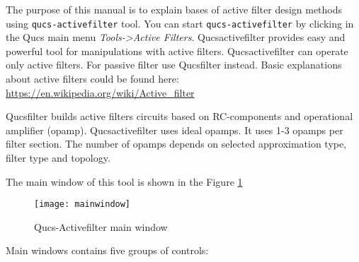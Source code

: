 %
%
%
%

\renewcommand{\thesubfigure}{\thefigure(\alph{subfigure})}
\makeatletter
  \renewcommand{\@thesubfigure}{\thesubfigure:\space}
  \renewcommand{\p@subfigure}{}
\makeatother

\renewcommand{\thesubtable}{\thetable(\alph{subtable})}
\makeatletter
  \renewcommand{\@thesubtable}{\thesubtable:\space}
  \renewcommand{\p@subtable}{}
\makeatother


The purpose of this manual is to explain bases of active filter design
methods using \verb|qucs-activefilter| tool. You can start
\verb|qucs-activefilter| by clicking in the Qucs main menu \emph{Tools->Active
Filters}. Qucsactivefilter provides easy and powerful tool for manipulations
with active filters. Qucsactivefilter can operate only active filters. For
passive filter use Qucsfilter instead. Basic explanations about active filters
could be found here: \url{https://en.wikipedia.org/wiki/Active_filter}

Qucsfilter builds active filters circuits based on RC-components and
operational amplifier (opamp). Qucsactivefilter uses ideal opamps.  It
uses 1-3 opamps per filter section. The number of opamps depends on selected
approximation type, filter type and topology.




The main window of this tool is shown in the Figure \ref{fig:mainwin}

\begin{figure}[ht]
  \centering
  \texttt{[image: mainwindow]}
  \caption{Qucs-Activefilter main window}
  \label{fig:mainwin}
\end{figure}
\FloatBarrier

Main windows contains five groups of controls: 

